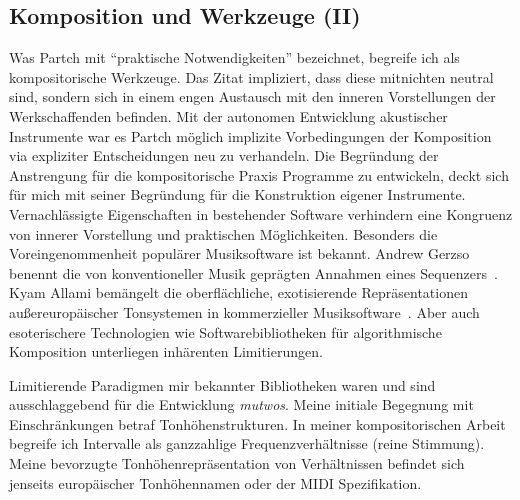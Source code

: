 \documentclass[12pt,a4paper,ngerman]{article}
\begin{document}
\subsection{Komposition und Werkzeuge (II)}
\label{compositionAndTools2}

\noindent
Was Partch mit ``praktische Notwendigkeiten'' bezeichnet, begreife ich als kompositorische Werkzeuge.
Das Zitat impliziert, dass diese mitnichten neutral sind, sondern sich in einem engen Austausch mit den inneren Vorstellungen der Werkschaffenden befinden.
Mit der autonomen Entwicklung akustischer Instrumente war es Partch möglich implizite Vorbedingungen der Komposition via expliziter Entscheidungen neu zu verhandeln.
Die Begründung der Anstrengung für die kompositorische Praxis Programme zu entwickeln, deckt sich für mich mit seiner Begründung für die Konstruktion eigener Instrumente.
Vernachlässigte Eigenschaften in bestehender Software verhindern eine Kongruenz von innerer Vorstellung und praktischen Möglichkeiten.
Besonders die Voreingenommenheit populärer Musiksoftware ist bekannt.
Andrew Gerzso benennt die von konventioneller Musik geprägten Annahmen eines Sequenzers~\parencite[S. 78]{paradigmsAndComputerMusic}.
Kyam Allami bemängelt die oberflächliche, exotisierende Repräsentationen außereuropäischer Tonsystemen in kommerzieller Musiksoftware~\parencite[S. 59f]{microtonalityAndTheStruggle}.
Aber auch esoterischere Technologien wie Softwarebibliotheken für algorithmische Komposition unterliegen inhärenten Limitierungen.

\bigskip

\noindent
Limitierende Paradigmen mir bekannter Bibliotheken waren und sind ausschlaggebend für die Entwicklung \emph{mutwos}.
Meine initiale Begegnung mit Einschränkungen betraf Tonhöhenstrukturen.
In meiner kompositorischen Arbeit begreife ich Intervalle als ganzzahlige Frequenzverhältnisse (reine Stimmung).
Meine bevorzugte Tonhöhenrepräsentation von Verhältnissen befindet sich jenseits europäischer Tonhöhennamen oder der MIDI Spezifikation.
\end{document}
